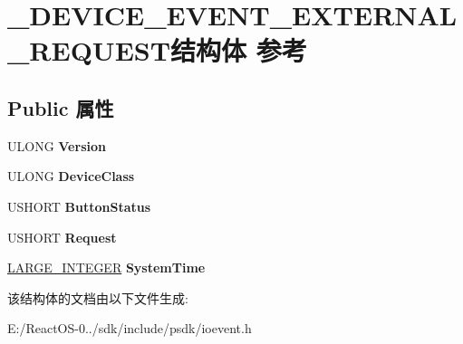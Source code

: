 \hypertarget{struct___d_e_v_i_c_e___e_v_e_n_t___e_x_t_e_r_n_a_l___r_e_q_u_e_s_t}{}\section{\+\_\+\+D\+E\+V\+I\+C\+E\+\_\+\+E\+V\+E\+N\+T\+\_\+\+E\+X\+T\+E\+R\+N\+A\+L\+\_\+\+R\+E\+Q\+U\+E\+S\+T结构体 参考}
\label{struct___d_e_v_i_c_e___e_v_e_n_t___e_x_t_e_r_n_a_l___r_e_q_u_e_s_t}
\subsection*{Public 属性}
\begin{DoxyCompactItemize}
\item 
\mbox{\label{struct___d_e_v_i_c_e___e_v_e_n_t___e_x_t_e_r_n_a_l___r_e_q_u_e_s_t_a987427aee68865cdf5a1063ca4e3b700}} 
U\+L\+O\+NG {\bfseries Version}
\item 
\mbox{\label{struct___d_e_v_i_c_e___e_v_e_n_t___e_x_t_e_r_n_a_l___r_e_q_u_e_s_t_ae406a90ba794f81c3a5d135a2cbf65fc}} 
U\+L\+O\+NG {\bfseries Device\+Class}
\item 
\mbox{\label{struct___d_e_v_i_c_e___e_v_e_n_t___e_x_t_e_r_n_a_l___r_e_q_u_e_s_t_aace157cfe4c240c22e8f0c83e96f053d}} 
U\+S\+H\+O\+RT {\bfseries Button\+Status}
\item 
\mbox{\label{struct___d_e_v_i_c_e___e_v_e_n_t___e_x_t_e_r_n_a_l___r_e_q_u_e_s_t_ad8506b5e896cd7f2a7cb79b536877d6c}} 
U\+S\+H\+O\+RT {\bfseries Request}
\item 
\mbox{\label{struct___d_e_v_i_c_e___e_v_e_n_t___e_x_t_e_r_n_a_l___r_e_q_u_e_s_t_a378774a3e84d616b0e9946df7fd71192}} 
\hyperlink{union___l_a_r_g_e___i_n_t_e_g_e_r}{L\+A\+R\+G\+E\+\_\+\+I\+N\+T\+E\+G\+ER} {\bfseries System\+Time}
\end{DoxyCompactItemize}


该结构体的文档由以下文件生成\+:\begin{DoxyCompactItemize}
\item 
E\+:/\+React\+O\+S-\/0../sdk/include/psdk/ioevent.\+h\end{DoxyCompactItemize}
